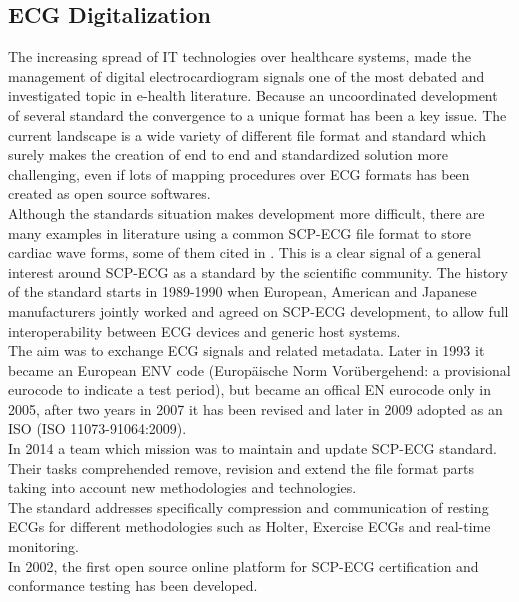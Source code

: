 \subsection{ECG Digitalization}
\label{subsection:ecgdigitaliation}
The increasing spread of IT technologies over healthcare systems, made the management of digital electrocardiogram signals one of the most debated and investigated topic in e-health literature. Because an uncoordinated development of several standard the convergence to a unique format has been a key issue. \cite{trigo} The current landscape is a wide variety of different file format and standard which surely makes the creation of end to end and standardized solution more challenging, even if lots of mapping procedures over ECG formats has been created as open source softwares.\\
Although the standards situation makes development more difficult, there are many examples in literature using a common SCP-ECG file format to store cardiac wave forms, some of them cited in \cite{trigo}. This is a clear signal of a general interest around SCP-ECG as a standard by the scientific community. The history of the standard starts in 1989-1990 when European, American and Japanese manufacturers jointly worked and agreed on SCP-ECG development, to allow full interoperability between ECG devices and generic host systems.\\
The aim was to exchange ECG signals and related metadata.
Later in 1993 it became an European ENV code (Europäische Norm Vorübergehend: a provisional eurocode to indicate a test period), but became an offical EN eurocode only in 2005, after two years in 2007 it has been revised and later in 2009 adopted as an ISO (ISO 11073-91064:2009).\\
In 2014 a team which mission was to maintain and update SCP-ECG standard. Their tasks comprehended remove, revision and extend the file format parts taking into account new methodologies and technologies.\cite{danilopani}\\
The standard addresses specifically compression and communication of resting ECGs for different methodologies such as Holter, Exercise ECGs and real-time monitoring.\\
In 2002, the first open source online platform for SCP-ECG certification and conformance testing has been developed.\cite{Chronaki}\\


